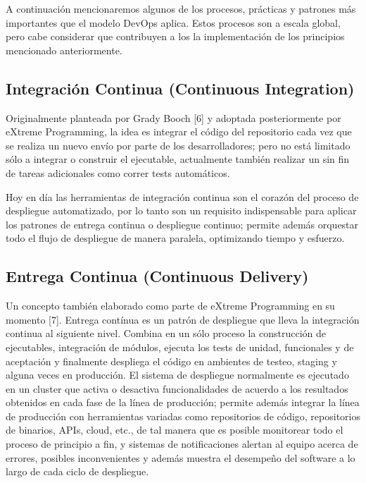 \documentclass[conference]{IEEEtran}
\begin{document}
A continuación mencionaremos algunos de los procesos, prácticas y patrones más importantes que el modelo DevOps aplica. Estos procesos son a escala global, pero cabe considerar que contribuyen a los la implementación de los principios mencionado anteriormente.

\subsection{Integración Continua (Continuous Integration)}

Originalmente planteada por Grady Booch [6] y adoptada posteriormente por eXtreme Programming, la idea es integrar el código del repositorio cada vez que se realiza  un nuevo envío por parte de los desarrolladores; pero no está limitado sólo a integrar o construir el ejecutable, actualmente también realizar un sin fin de tareas adicionales como correr tests automáticos.

Hoy en día las herramientas de integración continua son el corazón del proceso de despliegue automatizado, por lo tanto son un requisito indispensable para aplicar los patrones de entrega continua o despliegue continuo; permite además orquestar todo el flujo de despliegue de manera paralela, optimizando tiempo y esfuerzo.

\subsection{Entrega Continua (Continuous Delivery)}

Un concepto también elaborado como parte de eXtreme Programming en su momento [7]. Entrega contínua es un patrón de despliegue que lleva la integración continua al siguiente nivel. Combina en un sólo proceso la construcción de ejecutables, integración de módulos, ejecuta los tests de unidad, funcionales y de aceptación y finalmente despliega el código en ambientes de testeo, staging y alguna veces en producción. El sistema de despliegue normalmente es ejecutado en un cluster que activa o desactiva funcionalidades de acuerdo  a los resultados obtenidos en cada fase de la línea de producción; permite además integrar la línea de producción con herramientas variadas como repositorios de código, repositorios de binarios, APIs, cloud, etc., de tal manera que es posible monitorear todo el proceso de principio a fin, y sistemas de notificaciones alertan al equipo acerca de errores, posibles inconvenientes y además muestra el desempeño del software a lo largo de cada ciclo de despliegue.
\end{document}
